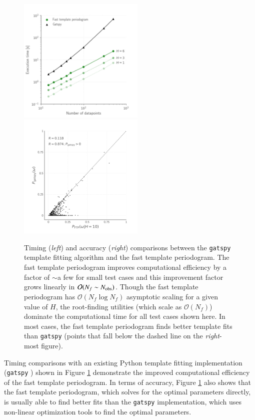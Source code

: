 \documentclass{webofc}
\newcommand{\bigO}{\mathcal{O}}
\begin{document}
\begin{figure}
\centering

\includegraphics[width=6cm,clip]{timing_vs_ndata.pdf}
\includegraphics[width=6cm,clip]{correlation_with_gatspy.pdf}
\caption{Timing (\emph{left}) and accuracy (\emph{right}) comparisons between the \texttt{gatspy} \cite{gatspy} template fitting algorithm 
and the fast template periodogram. The fast template periodogram improves computational efficiency by a factor of $\sim$a few for small test cases
and this improvement factor grows linearly in $\bigO(N_f\sim N_{\rm obs})$. Though the fast template periodogram has $\bigO(N_f\log N_f)$ asymptotic scaling for a given value of $H$, the root-finding utilities (which scale as $\bigO(N_f)$) dominate the computational time for all test cases shown here. In most cases, the fast template periodogram finds better template fits than \texttt{gatspy} (points that fall below the dashed line on the \emph{right}-most figure).}
\label{fig:timingacc}
\end{figure}

Timing comparisons with an existing Python template fitting implementation (\texttt{gatspy} \cite{gatspy}) shown in Figure \ref{fig:timingacc}
demonstrate the improved computational efficiency of the fast template periodogram. In terms of accuracy, Figure \ref{fig:timingacc} also
shows that the fast template periodogram, which solves for the optimal parameters directly, is usually able to find better
fits than the \texttt{gatspy} implementation, which uses non-linear optimization tools to find the optimal parameters. 
\end{document}
